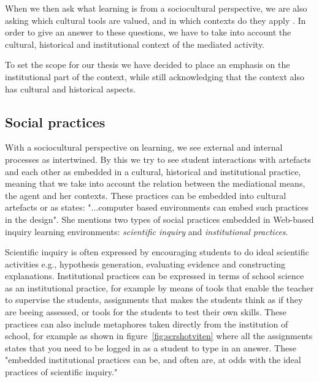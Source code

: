 When we then ask what learning is from a sociocultural perspective, we are also asking which cultural tools are valued, and in which contexts do they apply \citep{mifsud2010reconsidering}. In order to give an answer to these questions, we have to take into account the cultural, historical and institutional context of the mediated activity. 

To set the scope for our thesis we have decided to place an emphasis on the institutional part of the context, while still acknowledging that the context also has cultural and historical aspects.  

\subsection{Social practices}
With a sociocultural perspective on learning, we see external and internal processes as intertwined. By this we try to see student interactions with artefacts and each other as embedded in a cultural, historical and institutional practice, meaning that we take into account the relation between the mediational means, the agent and her contexts. These practices can be embedded into cultural artefacts or as \citet{furberg2009socio} states: "...computer based environments can embed such practices in the design". She mentions two types of social practices embedded in Web-based inquiry learning environments: \emph{scientific inquiry} and \emph{institutional practices}.  

Scientific inquiry is often expressed by encouraging students to do ideal scientific activities e.g., hypothesis generation, evaluating evidence and constructing explanations. Institutional practices can be expressed in terms of school science as an institutional practice, for example by means of tools that enable the teacher to supervise the students, assignments that makes the students think as if they are beeing assessed, or tools for the students to test their own skills. These practices can also include metaphores taken directly from the institution of school, for example as shown in figure~\ref{fig:scrshotviten} where all the assignments states that you need to be logged in as a student to type in an answer. These "embedded institutional practices can be, and often are, at odds with the ideal practices of scientific inquiry." \citetext{\citealp{chinn2002epistemologically}, referenced in \citealp{furberg2009socio}}

